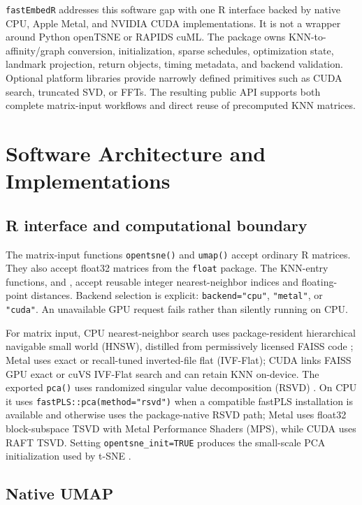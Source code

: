 \documentclass[twoside,11pt]{article}
\newcommand{\pkg}{\texttt{fastEmbedR}}
\begin{document}
\pkg{} addresses this software gap with one R interface backed by native CPU, Apple Metal, and NVIDIA CUDA implementations. It is not a wrapper around Python openTSNE or RAPIDS cuML. The package owns KNN-to-affinity/graph conversion, initialization, sparse schedules, optimization state, landmark projection, return objects, timing metadata, and backend validation. Optional platform libraries provide narrowly defined primitives such as CUDA search, truncated SVD, or FFTs. The resulting public API supports both complete matrix-input workflows and direct reuse of precomputed KNN matrices.

\section{Software Architecture and Implementations}

\subsection{R interface and computational boundary}

The matrix-input functions \texttt{opentsne()} and \texttt{umap()} accept ordinary R matrices. They also accept float32 matrices from the \texttt{float} package. The KNN-entry functions,  and , accept reusable integer nearest-neighbor indices and floating-point distances. Backend selection is explicit: \texttt{backend="cpu"}, \texttt{"metal"}, or \texttt{"cuda"}. An unavailable GPU request fails rather than silently running on CPU.

For matrix input, CPU nearest-neighbor search uses package-resident hierarchical navigable small world (HNSW), distilled from permissively licensed FAISS code \citep{johnson2019,douze2024}; Metal uses exact or recall-tuned inverted-file flat (IVF-Flat); CUDA links FAISS GPU exact or cuVS IVF-Flat search and can retain KNN on-device. The exported \texttt{pca()} uses randomized singular value decomposition (RSVD) \citep{halko2011}. On CPU it uses \texttt{fastPLS::pca(method="rsvd")} when a compatible fastPLS installation is available and otherwise uses the package-native RSVD path; Metal uses float32 block-subspace TSVD with Metal Performance Shaders (MPS), while CUDA uses RAFT TSVD. Setting \texttt{opentsne\_init=TRUE} produces the small-scale PCA initialization used by t-SNE \citep{kobak2019,fastpls}.

\subsection{Native UMAP}
\end{document}
